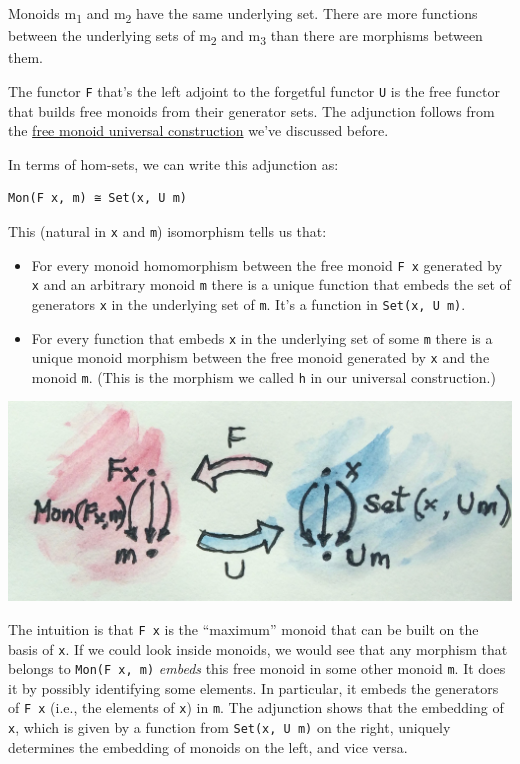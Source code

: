 Monoids m\textsubscript{1} and m\textsubscript{2} have the same
underlying set. There are more functions between the underlying sets of
m\textsubscript{2} and m\textsubscript{3} than there are morphisms
between them.

The functor \texttt{F} that's the left adjoint to the forgetful functor
\texttt{U} is the free functor that builds free monoids from their
generator sets. The adjunction follows from the
\href{https://bartoszmilewski.com/2015/07/21/free-monoids/}{free monoid
universal construction} we've discussed before.

In terms of hom-sets, we can write this adjunction as:

\begin{verbatim}
Mon(F x, m) ≅ Set(x, U m)
\end{verbatim}

This (natural in \texttt{x} and \texttt{m}) isomorphism tells us that:

\begin{itemize}
\tightlist
\item
  For every monoid homomorphism between the free monoid \texttt{F\ x}
  generated by \texttt{x} and an arbitrary monoid \texttt{m} there is a
  unique function that embeds the set of generators \texttt{x} in the
  underlying set of \texttt{m}. It's a function in
  \texttt{Set(x,\ U\ m)}.
\item
  For every function that embeds \texttt{x} in the underlying set of
  some \texttt{m} there is a unique monoid morphism between the free
  monoid generated by \texttt{x} and the monoid \texttt{m}. (This is the
  morphism we called \texttt{h} in our universal construction.)
\end{itemize}

\includegraphics[width=5.33333in]{images/freemonadjunction.jpg}

The intuition is that \texttt{F\ x} is the ``maximum'' monoid that can
be built on the basis of \texttt{x}. If we could look inside monoids, we
would see that any morphism that belongs to \texttt{Mon(F\ x,\ m)}
\emph{embeds} this free monoid in some other monoid \texttt{m}. It does
it by possibly identifying some elements. In particular, it embeds the
generators of \texttt{F\ x} (i.e., the elements of \texttt{x}) in
\texttt{m}. The adjunction shows that the embedding of \texttt{x}, which
is given by a function from \texttt{Set(x,\ U\ m)} on the right,
uniquely determines the embedding of monoids on the left, and vice
versa.

